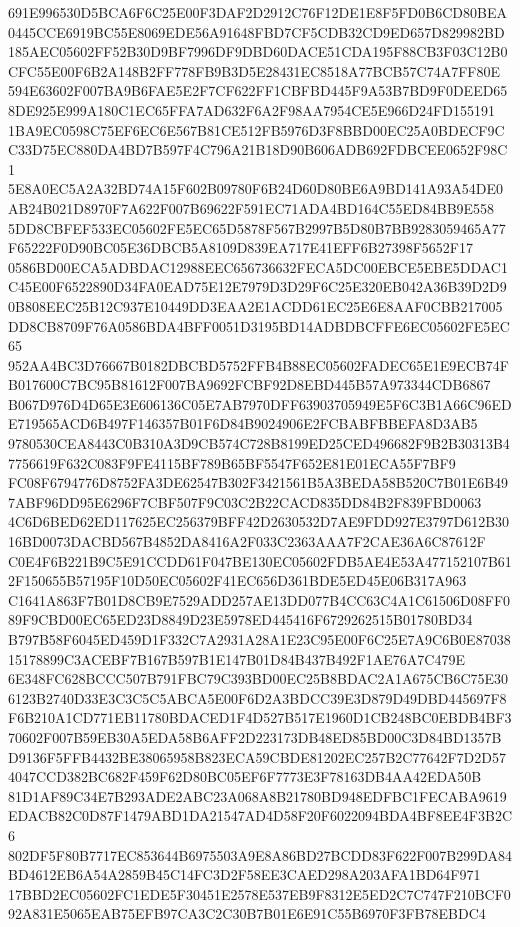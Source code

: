 \documentclass[UTF8,fontset=fandol,zihao=-4,a4paper]{ctexart}
\begin{document}
{{691E996530D5BCA6F6C25E00F3DAF2D2912C76F12DE1E8F5FD0B6CD80BEA0445CCE6919BC55E8069EDE56A91648FBD7CF5CDB32CD9ED657D829982BD
185AEC05602FF52B30D9BF7996DF9DBD60DACE51CDA195F88CB3F03C12B0CFC55E00F6B2A148B2FF778FB9B3D5E28431EC8518A77BCB57C74A7FF80E
594E63602F007BA9B6FAE5E2F7CF622FF1CBFBD445F9A53B7BD9F0DEED658DE925E999A180C1EC65FFA7AD632F6A2F98AA7954CE5E966D24FD155191
1BA9EC0598C75EF6EC6E567B81CE512FB5976D3F8BBD00EC25A0BDECF9CC33D75EC880DA4BD7B597F4C796A21B18D90B606ADB692FDBCEE0652F98C1
5E8A0EC5A2A32BD74A15F602B09780F6B24D60D80BE6A9BD141A93A54DE0AB24B021D8970F7A622F007B69622F591EC71ADA4BD164C55ED84BB9E558
5DD8CBFEF533EC05602FE5EC65D5878F567B2997B5D80B7BB9283059465A77F65222F0D90BC05E36DBCB5A8109D839EA717E41EFF6B27398F5652F17
0586BD00ECA5ADBDAC12988EEC656736632FECA5DC00EBCE5EBE5DDAC1C45E00F6522890D34FA0EAD75E12E7979D3D29F6C25E320EB042A36B39D2D9
0B808EEC25B12C937E10449DD3EAA2E1ACDD61EC25E6E8AAF0CBB217005DD8CB8709F76A0586BDA4BFF0051D3195BD14ADBDBCFFE6EC05602FE5EC65
952AA4BC3D76667B0182DBCBD5752FFB4B88EC05602FADEC65E1E9ECB74FB017600C7BC95B81612F007BA9692FCBF92D8EBD445B57A973344CDB6867
B067D976D4D65E3E606136C05E7AB7970DFF63903705949E5F6C3B1A66C96EDE719565ACD6B497F146357B01F6D84B9024906E2FCBABFBBEFA8D3AB5
9780530CEA8443C0B310A3D9CB574C728B8199ED25CED496682F9B2B30313B47756619F632C083F9FE4115BF789B65BF5547F652E81E01ECA55F7BF9
FC08F6794776D8752FA3DE62547B302F3421561B5A3BEDA58B520C7B01E6B497ABF96DD95E6296F7CBF507F9C03C2B22CACD835DD84B2F839FBD0063
4C6D6BED62ED117625EC256379BFF42D2630532D7AE9FDD927E3797D612B3016BD0073DACBD567B4852DA8416A2F033C2363AAA7F2CAE36A6C87612F
C0E4F6B221B9C5E91CCDD61F047BE130EC05602FDB5AE4E53A477152107B612F150655B57195F10D50EC05602F41EC656D361BDE5ED45E06B317A963
C1641A863F7B01D8CB9E7529ADD257AE13DD077B4CC63C4A1C61506D08FF089F9CBD00EC65ED23D8849D23E5978ED445416F6729262515B01780BD34
B797B58F6045ED459D1F332C7A2931A28A1E23C95E00F6C25E7A9C6B0E8703815178899C3ACEBF7B167B597B1E147B01D84B437B492F1AE76A7C479E
6E348FC628BCCC507B791FBC79C393BD00EC25B8BDAC2A1A675CB6C75E306123B2740D33E3C3C5C5ABCA5E00F6D2A3BDCC39E3D879D49DBD445697F8
F6B210A1CD771EB11780BDACED1F4D527B517E1960D1CB248BC0EBDB4BF370602F007B59EB30A5EDA58B6AFF2D223173DB48ED85BD00C3D84BD1357B
D9136F5FFB4432BE38065958B823ECA59CBDE81202EC257B2C77642F7D2D574047CCD382BC682F459F62D80BC05EF6F7773E3F78163DB4AA42EDA50B
81D1AF89C34E7B293ADE2ABC23A068A8B21780BD948EDFBC1FECABA9619EDACB82C0D87F1479ABD1DA21547AD4D58F20F6022094BDA4BF8EE4F3B2C6
802DF5F80B7717EC853644B6975503A9E8A86BD27BCDD83F622F007B299DA84BD4612EB6A54A2859B45C14FC3D2F58EE3CAED298A203AFA1BD64F971
17BBD2EC05602FC1EDE5F30451E2578E537EB9F8312E5ED2C7C747F210BCF092A831E5065EAB75EFB97CA3C2C30B7B01E6E91C55B6970F3FB78EBDC4
}}
\end{document}
